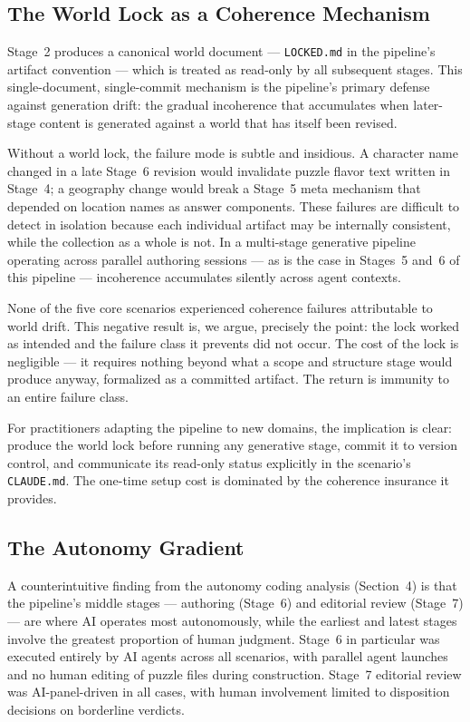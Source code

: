 \subsection{The World Lock as a Coherence Mechanism}

Stage~2 produces a canonical world document — \texttt{LOCKED.md} in the pipeline's artifact convention — which is treated as read-only by all subsequent stages. This single-document, single-commit mechanism is the pipeline's primary defense against generation drift: the gradual incoherence that accumulates when later-stage content is generated against a world that has itself been revised.

Without a world lock, the failure mode is subtle and insidious. A character name changed in a late Stage~6 revision would invalidate puzzle flavor text written in Stage~4; a geography change would break a Stage~5 meta mechanism that depended on location names as answer components. These failures are difficult to detect in isolation because each individual artifact may be internally consistent, while the collection as a whole is not. In a multi-stage generative pipeline operating across parallel authoring sessions — as is the case in Stages~5 and~6 of this pipeline — incoherence accumulates silently across agent contexts.

None of the five core scenarios experienced coherence failures attributable to world drift. This negative result is, we argue, precisely the point: the lock worked as intended and the failure class it prevents did not occur. The cost of the lock is negligible — it requires nothing beyond what a scope and structure stage would produce anyway, formalized as a committed artifact. The return is immunity to an entire failure class.

For practitioners adapting the pipeline to new domains, the implication is clear: produce the world lock before running any generative stage, commit it to version control, and communicate its read-only status explicitly in the scenario's \texttt{CLAUDE.md}. The one-time setup cost is dominated by the coherence insurance it provides.

\subsection{The Autonomy Gradient}

A counterintuitive finding from the autonomy coding analysis (Section~4) is that the pipeline's middle stages — authoring (Stage~6) and editorial review (Stage~7) — are where AI operates most autonomously, while the earliest and latest stages involve the greatest proportion of human judgment. Stage~6 in particular was executed entirely by AI agents across all scenarios, with parallel agent launches and no human editing of puzzle files during construction. Stage~7 editorial review was AI-panel-driven in all cases, with human involvement limited to disposition decisions on borderline verdicts.

